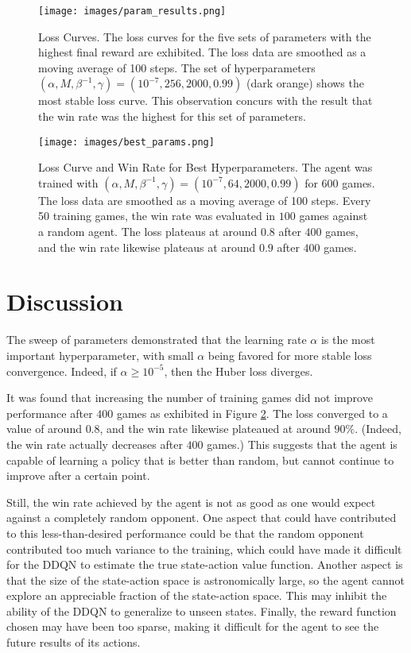 \documentclass[final,5p,times,twocolumn]{elsarticle}
\begin{document}
\begin{figure}[h!]
    \centering
    \texttt{[image: images/param\_results.png]}
    \caption{Loss Curves. The loss curves for the five sets of parameters with the highest final reward are exhibited. The loss data are smoothed as a moving average of 100 steps. The set of hyperparameters $(\alpha, M, \beta^{-1}, \gamma) = (10^{-7}, 256, 2000, 0.99)$ (dark orange) shows the most stable loss curve. This observation concurs with the result that the win rate was the highest for this set of parameters.}
    \label{fig:paramresults}
\end{figure}

\begin{figure}[h!]
  \centering
  \texttt{[image: images/best\_params.png]}
  \caption{Loss Curve and Win Rate for Best Hyperparameters. The agent was trained with $(\alpha, M, \beta^{-1}, \gamma) = (10^{-7}, 64, 2000, 0.99)$ for $600$ games. The loss data are smoothed as a moving average of 100 steps. Every 50 training games, the win rate was evaluated in $100$ games against a random agent. The loss plateaus at around $0.8$ after $400$ games, and the win rate likewise plateaus at around $0.9$ after $400$ games.}
  \label{fig:bestparams}
\end{figure}

\section{Discussion}
\label{sec:disc}

The sweep of parameters demonstrated that the learning rate $\alpha$ is the most important hyperparameter, with small $\alpha$ being favored for more stable loss convergence. Indeed, if $\alpha \geq 10^{-5}$, then the Huber loss diverges.

It was found that increasing the number of training games did not improve performance after $400$ games as exhibited in Figure \ref{fig:bestparams}. The loss converged to a value of around $0.8$, and the win rate likewise plateaued at around $90\%$. (Indeed, the win rate actually decreases after $400$ games.) This suggests that the agent is capable of learning a policy that is better than random, but cannot continue to improve after a certain point.

Still, the win rate achieved by the agent is not as good as one would expect against a completely random opponent. One aspect that could have contributed to this less-than-desired performance could be that the random opponent contributed too much variance to the training, which could have made it difficult for the DDQN to estimate the true state-action value function. Another aspect is that the size of the state-action space is astronomically large, so the agent cannot explore an appreciable fraction of the state-action space. This may inhibit the ability of the DDQN to generalize to unseen states. Finally, the reward function chosen may have been too sparse, making it difficult for the agent to see the future results of its actions.
\end{document}
